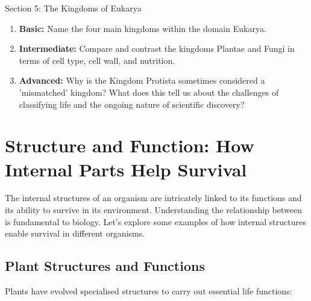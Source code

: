 \begin{tieredquestions}{Section 5: The Kingdoms of Eukarya}
\begin{enumerate}
    \item \textbf{Basic:} Name the four main kingdoms within the domain Eukarya.
    \item \textbf{Intermediate:} Compare and contrast the kingdoms Plantae and Fungi in terms of cell type, cell wall, and nutrition.
    \item \textbf{Advanced:}  Why is the Kingdom Protista sometimes considered a 'mismatched' kingdom? What does this tell us about the challenges of classifying life and the ongoing nature of scientific discovery?
\end{enumerate}
\end{tieredquestions}


\section{Structure and Function: How Internal Parts Help Survival}

The internal structures of an organism are intricately linked to its functions and its ability to survive in its environment.  Understanding the relationship between  is fundamental to biology.  Let's explore some examples of how internal structures enable survival in different organisms.

\subsection{Plant Structures and Functions}

Plants have evolved specialised structures to carry out essential life functions:

